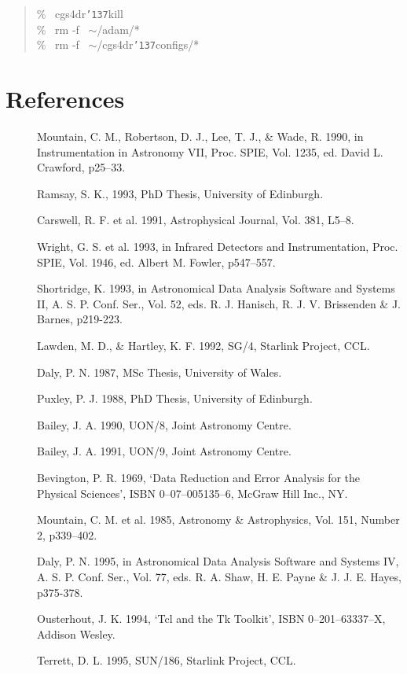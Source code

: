 \documentclass[a4paper]{book}
\newcommand{\stardocinitials}  {SUN}
\newcommand{\stardocnumber}    {27.5}
\newcommand{\stardocname}{\stardocinitials /\stardocnumber}
\renewcommand{\_}{{\tt\char'137}}
\begin{document}
\begin{quote}
  \% \ cgs4dr\_kill \\
  \% \ rm -f \ $\sim$/adam/* \\
  \% \ rm -f \ $\sim$/cgs4dr\_configs/*
\end{quote}

\chapter*{References}
\markboth{References}{\stardocname}

\begin{description}
\item[] Mountain, C. M., Robertson, D. J., Lee, T. J., \& Wade, R. 1990,
      in Instrumentation in Astronomy VII, Proc. SPIE, Vol. 1235, ed. David L. Crawford, p25--33.
\item[] Ramsay, S. K., 1993, PhD Thesis, University of Edinburgh.
\item[] Carswell, R. F. et al. 1991, Astrophysical Journal, Vol. 381, L5--8.
\item[] Wright, G. S. et al. 1993, in Infrared Detectors and Instrumentation, Proc. SPIE,
      Vol. 1946, ed. Albert M. Fowler, p547--557.
\item[] Shortridge, K. 1993, in  Astronomical Data Analysis Software
      and Systems II, A. S. P. Conf. Ser., Vol. 52, eds. R. J. Hanisch, 
      R. J. V. Brissenden \& J. Barnes, p219-223.
\item[] Lawden, M. D., \& Hartley, K. F. 1992, SG/4, Starlink Project, CCL.
\item[] Daly, P. N. 1987, MSc Thesis, University of Wales.
\item[] Puxley, P. J. 1988, PhD Thesis, University of Edinburgh.
\item[] Bailey, J. A. 1990, UON/8, Joint Astronomy Centre.
\item[] Bailey, J. A. 1991, UON/9, Joint Astronomy Centre.
\item[] Bevington, P. R. 1969, `Data Reduction and Error Analysis for the Physical Sciences',
      ISBN 0--07--005135--6, McGraw Hill Inc., NY.
\item[] Mountain, C. M. et al. 1985, Astronomy \& Astrophysics, Vol. 151, Number 2, p339--402.
\item[] Daly, P. N. 1995, in Astronomical Data Analysis Software and Systems IV, 
      A. S. P. Conf. Ser., Vol. 77, eds. R. A. Shaw, H. E. Payne \& J. J. E. Hayes, p375-378.
\item[] Ousterhout, J. K. 1994, `Tcl and the Tk Toolkit', ISBN 0--201--63337--X, Addison Wesley.
\item[] Terrett, D. L. 1995, SUN/186, Starlink Project, CCL.
\end{description}
\end{document}
